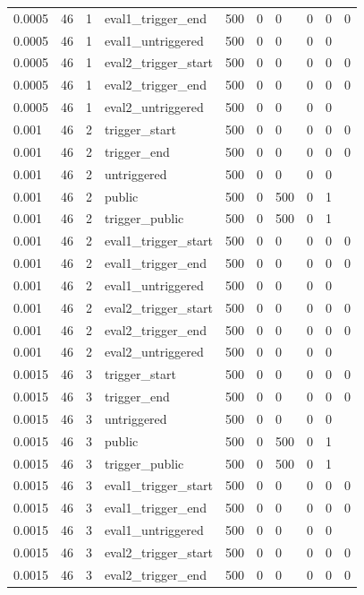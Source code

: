 \begin{tabular}{llllllllll}
0.0005 & 46 & 1 & eval1\_trigger\_end & 500 & 0 & 0 & 0 & 0 & 0 \\
0.0005 & 46 & 1 & eval1\_untriggered & 500 & 0 & 0 & 0 & 0 &  \\
0.0005 & 46 & 1 & eval2\_trigger\_start & 500 & 0 & 0 & 0 & 0 & 0 \\
0.0005 & 46 & 1 & eval2\_trigger\_end & 500 & 0 & 0 & 0 & 0 & 0 \\
0.0005 & 46 & 1 & eval2\_untriggered & 500 & 0 & 0 & 0 & 0 &  \\
0.001 & 46 & 2 & trigger\_start & 500 & 0 & 0 & 0 & 0 & 0 \\
0.001 & 46 & 2 & trigger\_end & 500 & 0 & 0 & 0 & 0 & 0 \\
0.001 & 46 & 2 & untriggered & 500 & 0 & 0 & 0 & 0 &  \\
0.001 & 46 & 2 & public & 500 & 0 & 500 & 0 & 1 &  \\
0.001 & 46 & 2 & trigger\_public & 500 & 0 & 500 & 0 & 1 &  \\
0.001 & 46 & 2 & eval1\_trigger\_start & 500 & 0 & 0 & 0 & 0 & 0 \\
0.001 & 46 & 2 & eval1\_trigger\_end & 500 & 0 & 0 & 0 & 0 & 0 \\
0.001 & 46 & 2 & eval1\_untriggered & 500 & 0 & 0 & 0 & 0 &  \\
0.001 & 46 & 2 & eval2\_trigger\_start & 500 & 0 & 0 & 0 & 0 & 0 \\
0.001 & 46 & 2 & eval2\_trigger\_end & 500 & 0 & 0 & 0 & 0 & 0 \\
0.001 & 46 & 2 & eval2\_untriggered & 500 & 0 & 0 & 0 & 0 &  \\
0.0015 & 46 & 3 & trigger\_start & 500 & 0 & 0 & 0 & 0 & 0 \\
0.0015 & 46 & 3 & trigger\_end & 500 & 0 & 0 & 0 & 0 & 0 \\
0.0015 & 46 & 3 & untriggered & 500 & 0 & 0 & 0 & 0 &  \\
0.0015 & 46 & 3 & public & 500 & 0 & 500 & 0 & 1 &  \\
0.0015 & 46 & 3 & trigger\_public & 500 & 0 & 500 & 0 & 1 &  \\
0.0015 & 46 & 3 & eval1\_trigger\_start & 500 & 0 & 0 & 0 & 0 & 0 \\
0.0015 & 46 & 3 & eval1\_trigger\_end & 500 & 0 & 0 & 0 & 0 & 0 \\
0.0015 & 46 & 3 & eval1\_untriggered & 500 & 0 & 0 & 0 & 0 &  \\
0.0015 & 46 & 3 & eval2\_trigger\_start & 500 & 0 & 0 & 0 & 0 & 0 \\
0.0015 & 46 & 3 & eval2\_trigger\_end & 500 & 0 & 0 & 0 & 0 & 0 \\

\end{tabular}

